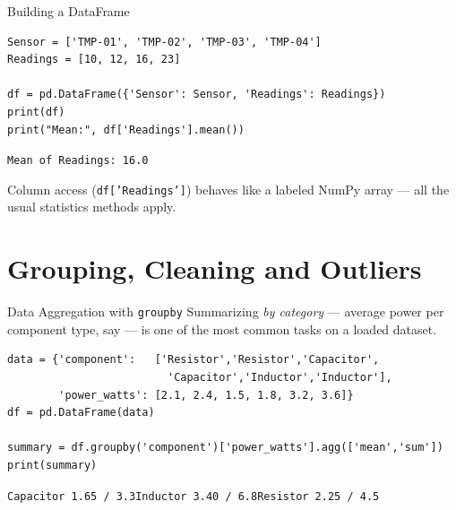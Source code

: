 \documentclass[9pt,aspectratio=169,xcolor=table]{beamer}
\begin{document}
\begin{frame}[fragile]{Building a DataFrame}
    \leavevmode
\begin{lstlisting}
Sensor = ['TMP-01', 'TMP-02', 'TMP-03', 'TMP-04']
Readings = [10, 12, 16, 23]

df = pd.DataFrame({'Sensor': Sensor, 'Readings': Readings})
print(df)
print("Mean:", df['Readings'].mean())
\end{lstlisting}
    \texttt{Mean of Readings: 16.0}

    \vspace{2mm}
    {\small Column access (\texttt{df['Readings']}) behaves like a
    labeled NumPy array --- all the usual statistics methods apply.}
\end{frame}

\section{Grouping, Cleaning and Outliers}

\begin{frame}[fragile]{Data Aggregation with \texttt{groupby}}
    \leavevmode
    Summarizing \emph{by category} --- average power per component type,
    say --- is one of the most common tasks on a loaded dataset.

\begin{lstlisting}
data = {'component':   ['Resistor','Resistor','Capacitor',
                         'Capacitor','Inductor','Inductor'],
        'power_watts': [2.1, 2.4, 1.5, 1.8, 3.2, 3.6]}
df = pd.DataFrame(data)

summary = df.groupby('component')['power_watts'].agg(['mean','sum'])
print(summary)
\end{lstlisting}
    \texttt{Capacitor 1.65 / 3.3\quad Inductor 3.40 / 6.8\quad Resistor 2.25 / 4.5}
\end{frame}
\end{document}
